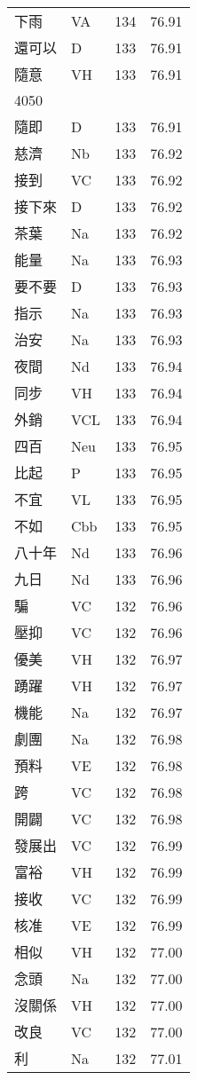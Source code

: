 \documentclass[twocolumn]{book}
\begin{document}
\begin{supertabular}{llrr}
下雨 & VA & 134 &  76.91\\
還可以 & D & 133 &  76.91\\
隨意 & VH & 133 &  76.91\\
4050\\
隨即 & D & 133 &  76.91\\
慈濟 & Nb & 133 &  76.92\\
接到 & VC & 133 &  76.92\\
接下來 & D & 133 &  76.92\\
茶葉 & Na & 133 &  76.92\\
能量 & Na & 133 &  76.93\\
要不要 & D & 133 &  76.93\\
指示 & Na & 133 &  76.93\\
治安 & Na & 133 &  76.93\\
夜間 & Nd & 133 &  76.94\\
同步 & VH & 133 &  76.94\\
外銷 & VCL & 133 &  76.94\\
四百 & Neu & 133 &  76.95\\
比起 & P & 133 &  76.95\\
不宜 & VL & 133 &  76.95\\
不如 & Cbb & 133 &  76.95\\
八十年 & Nd & 133 &  76.96\\
九日 & Nd & 133 &  76.96\\
騙 & VC & 132 &  76.96\\
壓抑 & VC & 132 &  76.96\\
優美 & VH & 132 &  76.97\\
踴躍 & VH & 132 &  76.97\\
機能 & Na & 132 &  76.97\\
劇團 & Na & 132 &  76.98\\
預料 & VE & 132 &  76.98\\
跨 & VC & 132 &  76.98\\
開闢 & VC & 132 &  76.98\\
發展出 & VC & 132 &  76.99\\
富裕 & VH & 132 &  76.99\\
接收 & VC & 132 &  76.99\\
核准 & VE & 132 &  76.99\\
相似 & VH & 132 &  77.00\\
念頭 & Na & 132 &  77.00\\
沒關係 & VH & 132 &  77.00\\
改良 & VC & 132 &  77.00\\
利 & Na & 132 &  77.01\\

\end{supertabular}
\end{document}
